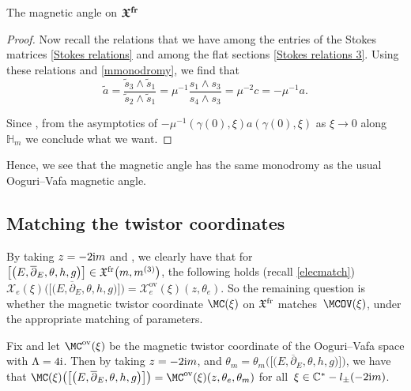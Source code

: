 \begin{subsubsection}{The magnetic angle on $\boldsymbol{\mathfrak{X}^{{\rm fr}}}$}
\begin{proof}
Now recall the relations that we have among the entries of the Stokes matrices \eqref{Stokes relations} and among the flat sections \eqref{Stokes relations 3}. Using these relations and \eqref{mmonodromy}, we find that
\begin{equation*}
 \widetilde{a}=\frac{\widetilde{s}_3\wedge \widetilde{s}_1}{\widetilde{s}_2\wedge \widetilde{s}_1}= \mu^{-1}\frac{ s_1 \wedge s_3}{s_4\wedge s_3}=\mu^{-2}c=-\mu^{-1} a.
\end{equation*}

Since , from the asymptotics of $-\mu^{-1}(\gamma(0),\xi)a(\gamma(0),\xi)$ as $\xi \to 0$ along $\mathbb{H}_m$ we conclude what we want.
\end{proof}

Hence, we see that the magnetic angle has the same monodromy as the usual Ooguri--Vafa magnetic angle.

\end{subsubsection}


\subsection{Matching the twistor coordinates}\label{OVT}
By taking $z= -2{\rm i}m$ and , we clearly have that for $\bigl[\bigl(E,\overline{\partial}_E,\theta,h,g\bigr)\bigr]\in \mathfrak{X}^{{\rm fr}}\bigl(m,m^{(3)}\bigr)$, the following holds (recall \eqref{elecmatch})
$\mathcal{X}_e(\xi)\bigl(\bigl[\bigl(E,\overline{\partial}_E,\theta,h,g\bigr)\bigr]\bigr)=\mathcal{X}_e^{\text{ov}}(\xi)(z,\theta_e)$.
So the remaining question is whether the magnetic twistor coordinate $\MC(\xi)$ on $\mathfrak{X}^{{\rm fr}}$ match\-es~$\MCOV(\xi)$, under the appropriate matching of parameters.

\begin{Theorem} \label{matchingTC} Fix  and let $\MC^{\textnormal{ov}}(\xi)$ be the magnetic twistor coordinate of the Ooguri--Vafa space with $\Lambda=4{\rm i}$. Then by taking $z=-2{\rm i}m$,  and $\theta_m=\theta_m\bigl(\bigl[\bigl(E,\overline{\partial}_E,\theta,h,g\bigr)\bigr]\bigr)$, we have that $\MC(\xi)\bigl(\bigl[\bigl(E,\overline{\partial}_E,\theta,h,g\bigr)\bigr]\bigr)= \MC^{\textnormal{ov}}(\xi)(z,\theta_e,\theta_m)$ for all~${\xi \in \mathbb{C}^* - l_{\pm}(-2{\rm i}m)}$.
\end{Theorem}

